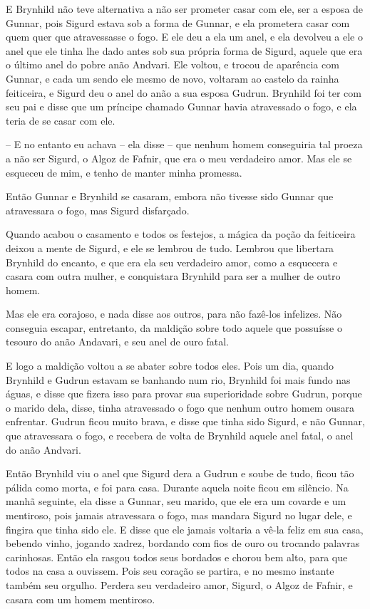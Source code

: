 E Brynhild não teve alternativa a não ser prometer casar com ele, ser
a esposa de Gunnar, pois Sigurd estava sob a forma de Gunnar, e ela
prometera casar com quem quer que atravessasse o fogo. E ele deu a
ela um anel, e ela devolveu a ele o anel que ele tinha lhe dado antes
sob sua própria forma de Sigurd, aquele que era o último anel do
pobre anão Andvari. Ele voltou, e trocou de aparência com Gunnar, e
cada um sendo ele mesmo de novo, voltaram ao castelo da rainha
feiticeira, e Sigurd deu o anel do anão a sua esposa Gudrun. Brynhild
foi ter com seu pai e disse que um príncipe chamado Gunnar havia
atravessado o fogo, e ela teria de se casar com ele. 

-- E no entanto eu achava -- ela disse -- que nenhum homem conseguiria
tal proeza a não ser Sigurd, o Algoz de Fafnir, que era o meu
verdadeiro amor. Mas ele se esqueceu de mim, e tenho de manter minha
promessa. 

Então Gunnar e Brynhild se casaram, embora não tivesse sido Gunnar que
atravessara o fogo, mas Sigurd disfarçado. 

Quando acabou o casamento e todos os festejos, a mágica da poção da
feiticeira deixou a mente de Sigurd, e ele se lembrou de tudo.
Lembrou que libertara Brynhild do encanto, e que era ela seu
verdadeiro amor, como a esquecera e casara com outra mulher, e
conquistara Brynhild para ser a mulher de outro homem. 

Mas ele era corajoso, e nada disse aos outros, para não fazê-los
infelizes. Não conseguia escapar, entretanto, da maldição sobre todo
aquele que possuísse o tesouro do anão Andavari, e seu anel de ouro
fatal. 

E logo a maldição voltou a se abater sobre todos eles. Pois um dia,
quando Brynhild e Gudrun estavam se banhando num rio, Brynhild foi
mais fundo nas águas, e disse que fizera isso para provar sua
superioridade sobre Gudrun, porque o marido dela, disse, tinha
atravessado o fogo que nenhum outro homem ousara enfrentar. Gudrun
ficou muito brava, e disse que tinha sido Sigurd, e não Gunnar, que
atravessara o fogo, e recebera de volta de Brynhild aquele anel
fatal, o anel do anão Andvari. 

Então Brynhild viu o anel que Sigurd dera a Gudrun e soube de tudo,
ficou tão pálida como morta, e foi para casa. Durante aquela noite
ficou em silêncio. Na manhã seguinte, ela disse a Gunnar, seu marido,
que ele era um covarde e um mentiroso, pois jamais atravessara o
fogo, mas mandara Sigurd no lugar dele, e fingira que tinha sido ele.
E disse que ele jamais voltaria a vê-la feliz em sua casa, bebendo
vinho, jogando xadrez, bordando com fios de ouro ou trocando palavras
carinhosas. Então ela rasgou todos seus bordados e chorou bem alto,
para que todos na casa a ouvissem. Pois seu coração se partira, e no
mesmo instante também seu orgulho. Perdera seu verdadeiro amor,
Sigurd, o Algoz de Fafnir, e casara com um homem mentiroso. 


